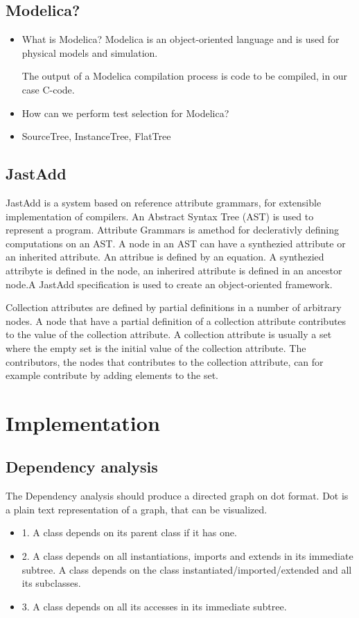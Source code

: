 \documentclass{cslthse-msc}
\begin{document}
\section{Modelica?}
\begin{itemize}
	\item What is Modelica?
Modelica is an object-oriented language and is used for physical models and simulation. 

The output of a Modelica compilation process is code to be compiled, in our case C-code.~\cite{aakesson2008development}
	\item How can we perform test selection for Modelica?
	\item SourceTree, InstanceTree, FlatTree
\end{itemize}

\section{JastAdd}
JastAdd is a system based on reference attribute grammars, for extensible implementation of compilers. An Abstract Syntax Tree (AST) is used to represent a program. Attribute Grammars is amethod for declerativly defining computations on an AST. A node in an AST can have a synthezied attribute or an inherited attribute. An attribue is defined by an equation. A synthezied attribyte is defined in the node, an inherired attribute is defined in an ancestor node.A JastAdd specification is used to create an object-oriented framework.~\cite{aakesson2008development}

Collection attributes are defined by partial definitions in a number of arbitrary nodes. A node that have a partial definition of a collection attribute contributes to the value of the collection attribute. A collection attribute is usually a set where the empty set is the initial value of the collection attribute. The contributors, the nodes that contributes to the collection attribute, can for example contribute by adding elements to the set.~\cite{magnusson2007extending}

\chapter[Implementation]{Implementation}

\section{Dependency analysis}
The Dependency analysis should produce a directed graph on dot format. Dot is a plain text representation of a graph, that can be visualized.
\begin{itemize}
\item 1. A class depends on its parent class if it has one.

\item 2. A class depends on all instantiations, imports and extends in its immediate subtree. A class depends on the class instantiated/imported/extended and all its subclasses.

\item 3. A class depends on all its accesses in its immediate subtree.
\end{itemize}
\end{document}
